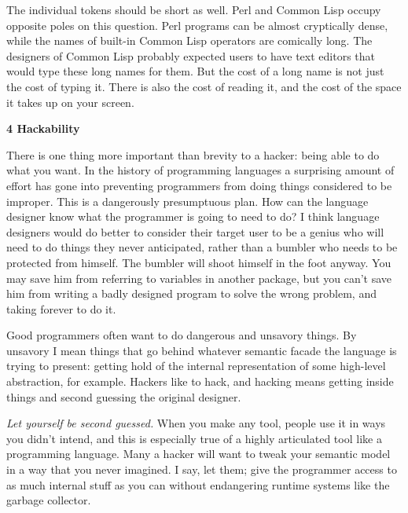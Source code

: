 The
                  individual tokens should be short as well. Perl and Common
                  Lisp occupy opposite poles on this question. Perl programs can
                  be almost cryptically dense, while the names of built-in
                  Common Lisp operators are comically long. The designers of
                  Common Lisp probably expected users to have text editors that
                  would type these long names for them. But the cost of a long
                  name is not just the cost of typing it. There is also the cost
                  of reading it, and the cost of the space it takes up on your
                  screen.

\textbf{4 Hackability}

There is
                  one thing more important than brevity to a hacker: being able
                  to do what you want. In the history of programming languages a
                  surprising amount of effort has gone into preventing
                  programmers from doing things considered to be improper. This
                  is a dangerously presumptuous plan. How can the language
                  designer know what the programmer is going to need to do? I
                  think language designers would do better to consider their
                  target user to be a genius who will need to do things they
                  never anticipated, rather than a bumbler who needs to be
                  protected from himself. The bumbler will shoot himself in the
                  foot anyway. You may save him from referring to variables in
                  another package, but you can't save him from writing a badly
                  designed program to solve the wrong problem, and taking
                  forever to do it.

Good programmers often want to do
                  dangerous and unsavory things. By unsavory I mean things that
                  go behind whatever semantic facade the language is trying to
                  present: getting hold of the internal representation of some
                  high-level abstraction, for example. Hackers like to hack, and
                  hacking means getting inside things and second guessing the
                  original designer.

\emph{Let yourself be second guessed.}
                  When you make any tool, people use it in ways you didn't
                  intend, and this is especially true of a highly articulated
                  tool like a programming language. Many a hacker will want to
                  tweak your semantic model in a way that you never imagined. I
                  say, let them; give the programmer access to as much internal
                  stuff as you can without endangering runtime systems like the
                  garbage collector.

